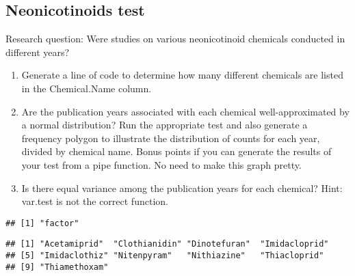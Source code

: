 \documentclass[]{article}
\newenvironment{Shaded}{\begin{snugshade}}{\end{snugshade}}
\newcommand{\KeywordTok}[1]{\textcolor[rgb]{0.13,0.29,0.53}{\textbf{#1}}}
\newcommand{\CommentTok}[1]{\textcolor[rgb]{0.56,0.35,0.01}{\textit{#1}}}
\newcommand{\OperatorTok}[1]{\textcolor[rgb]{0.81,0.36,0.00}{\textbf{#1}}}
\newcommand{\NormalTok}[1]{#1}
\begin{document}
\subsection{Neonicotinoids test}\label{neonicotinoids-test}

Research question: Were studies on various neonicotinoid chemicals
conducted in different years?

\begin{enumerate}
\def\labelenumi{\arabic{enumi}.}
\setcounter{enumi}{2}
\item
  Generate a line of code to determine how many different chemicals are
  listed in the Chemical.Name column.
\item
  Are the publication years associated with each chemical
  well-approximated by a normal distribution? Run the appropriate test
  and also generate a frequency polygon to illustrate the distribution
  of counts for each year, divided by chemical name. Bonus points if you
  can generate the results of your test from a pipe function. No need to
  make this graph pretty.
\item
  Is there equal variance among the publication years for each chemical?
  Hint: var.test is not the correct function.
\end{enumerate}

\begin{Shaded}
\end{Shaded}

\begin{verbatim}
## [1] "factor"
\end{verbatim}

\begin{Shaded}
\end{Shaded}

\begin{verbatim}
## [1] "Acetamiprid"  "Clothianidin" "Dinotefuran"  "Imidacloprid"
## [5] "Imidaclothiz" "Nitenpyram"   "Nithiazine"   "Thiacloprid" 
## [9] "Thiamethoxam"
\end{verbatim}
\end{document}
